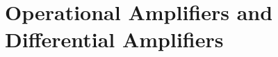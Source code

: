 \documentclass[../course]{subfiles}
\begin{document}
\chapter{Operational Amplifiers and Differential Amplifiers}


\end{document}

